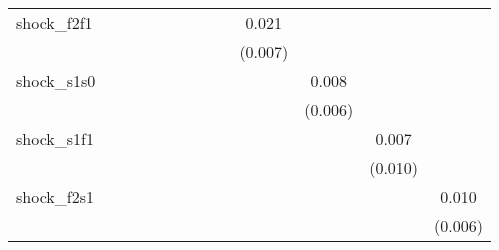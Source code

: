 {\begin{tabular}{l*{12}{c}}
\addlinespace
shock\_f2f1  &                     &                     &                     &                     &                     &                     &                     &                     &       0.021\sym{***}&                     &                     &                     \\
            &                     &                     &                     &                     &                     &                     &                     &                     &     (0.007)         &                     &                     &                     \\
\addlinespace
shock\_s1s0  &                     &                     &                     &                     &                     &                     &                     &                     &                     &       0.008         &                     &                     \\
            &                     &                     &                     &                     &                     &                     &                     &                     &                     &     (0.006)         &                     &                     \\
\addlinespace
shock\_s1f1  &                     &                     &                     &                     &                     &                     &                     &                     &                     &                     &       0.007         &                     \\
            &                     &                     &                     &                     &                     &                     &                     &                     &                     &                     &     (0.010)         &                     \\
\addlinespace
shock\_f2s1  &                     &                     &                     &                     &                     &                     &                     &                     &                     &                     &                     &       0.010         \\
            &                     &                     &                     &                     &                     &                     &                     &                     &                     &                     &                     &     (0.006)         \\

\end{tabular}}
